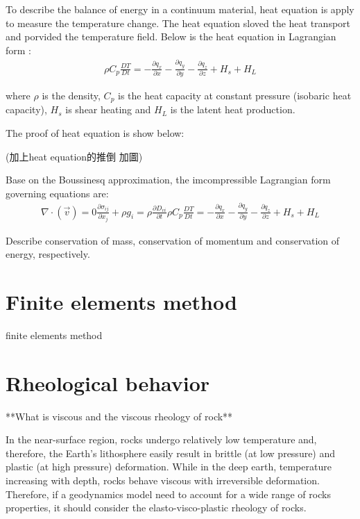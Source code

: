 To describe the balance of energy in a continuum material, heat equation is apply to measure the temperature change. The heat equation sloved the heat transport and porvided the temperature field. Below is the heat equation in Lagrangian form :
\begin{align}
\rho C_p \frac{DT}{Dt} = -\frac{\partial q_x}{\partial x}-\frac{\partial q_y}{\partial y}-\frac{\partial q_z}{\partial z}+H_s+H_L
\end{align}

where $\rho$ is the density, $C_p$ is the heat capacity at constant pressure (isobaric heat capacity), $H_s$ is shear heating and $H_L$ is the latent heat production.

The proof of heat equation is show below:

(加上heat equation的推倒
加圖)

Base on the Boussinesq approximation, the imcompressible Lagrangian form governing equations are:
\begin{align}
\nabla \cdot (\vec v) = 0 
\frac{\partial \sigma_{ij}}{\partial x_j}+\rho g_i = \rho \frac{\partial D_{vi}}{\partial t}
\rho C_p \frac{DT}{Dt} = -\frac{\partial q_x}{\partial x}-\frac{\partial q_y}{\partial y}-\frac{\partial q_z}{\partial z}+H_s+H_L
\end{align}

Describe conservation of mass, conservation of momentum and conservation of energy, respectively.


\section{Finite elements method}

finite elements method

\section{Rheological behavior}

**What is viscous and the viscous rheology of rock**

In the near-surface region, rocks undergo relatively low temperature and, therefore, the Earth's lithosphere easily result in brittle (at low pressure) and plastic (at high pressure) deformation. 
While in the deep earth, temperature increasing with depth, rocks behave viscous with irreversible deformation. 
Therefore, if a geodynamics model need to account for a wide range of rocks properties, it should consider the elasto-visco-plastic rheology of rocks.

